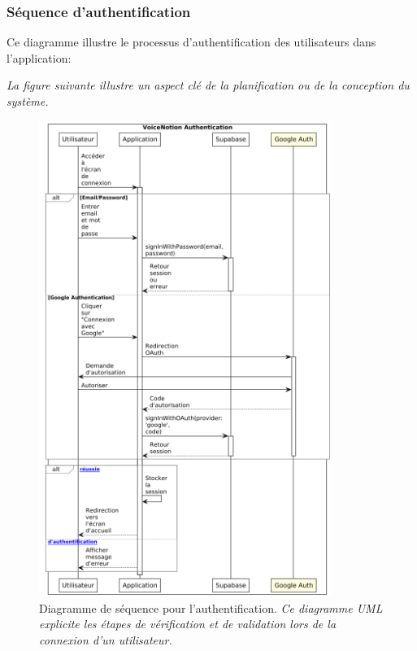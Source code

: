 \subsubsection{Séquence d'authentification}

Ce diagramme illustre le processus d'authentification des utilisateurs dans l'application:

\noindent
\textit{La figure suivante illustre un aspect clé de la planification ou de la conception du système.}
\begin{figure}[H]
    \centering
    \includegraphics[width=0.85\textwidth]{assets/docs/voicenotion_auth_sequence.png}
    \caption{Diagramme de séquence pour l'authentification. \newline\textit{Ce diagramme UML explicite les étapes de vérification et de validation lors de la connexion d'un utilisateur.}}
    \label{fig:sequence_auth}
\end{figure}

